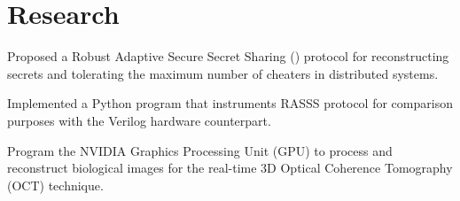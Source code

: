 \documentclass[]{deedy_format_Hien}
\begin{document}
\begin{minipage}[t]{0.66\textwidth}

\vspace{-2mm} %
\section{Research}
\vspace{\topsep} %
\vspace{-2.5mm}
\justify
\begin{tightemize}
\item Proposed a Robust Adaptive Secure Secret Sharing () protocol for reconstructing secrets and tolerating the maximum number of cheaters in distributed systems.
\item Implemented a Python program that instruments RASSS protocol for comparison purposes with the Verilog hardware counterpart.
\end{tightemize}
\vspace{\topsep}
\sectionsep

\vspace{-1mm} %
\vspace{\topsep} %
\vspace{-2.5mm}
\justify
\begin{tightemize}
\item Program the NVIDIA Graphics Processing Unit (GPU) to process and reconstruct biological images for the real-time 3D Optical Coherence Tomography (OCT) technique. 
\end{tightemize}
\vspace{\topsep}
\sectionsep


\vspace{-2mm} %

\end{minipage}
\end{document}
